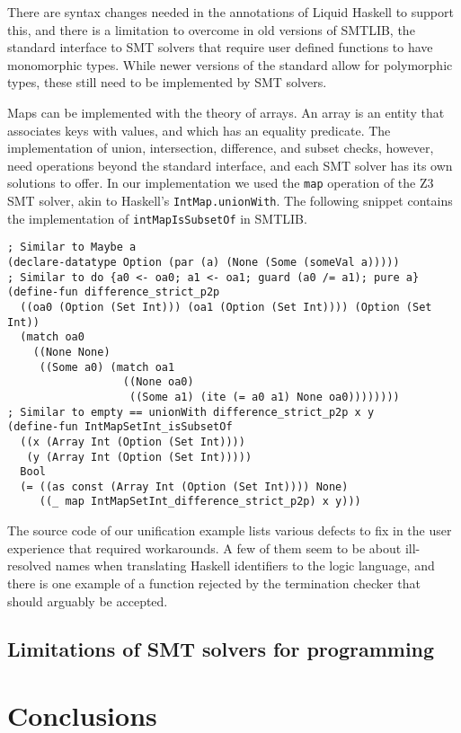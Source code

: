 \documentclass[acmtog, anonymous]{acmart}
\newcommand{\tc}[1]{{\small\texttt{#1}}}
\begin{document}
There are syntax changes needed in the annotations of Liquid Haskell to support
this, and there is a limitation to overcome in old versions of SMTLIB, the standard
interface to SMT solvers \cite{BarFT-RR-25} that require user defined functions to
have monomorphic types. While newer versions of the standard allow for polymorphic
types, these still need to be implemented by SMT solvers.

Maps can be implemented with the theory of arrays. An array is an entity that
associates keys with values, and which has an equality predicate.
The implementation of union, intersection, difference, and subset checks, however,
need operations beyond the standard interface, and each SMT solver has its own
solutions to offer. In our implementation we used the \tc{map} operation of the
Z3 SMT solver, akin to Haskell's \tc{IntMap.unionWith}. The following snippet
contains the implementation of \tc{intMapIsSubsetOf} in SMTLIB.

\begin{verbatim}
; Similar to Maybe a
(declare-datatype Option (par (a) (None (Some (someVal a)))))
; Similar to do {a0 <- oa0; a1 <- oa1; guard (a0 /= a1); pure a}
(define-fun difference_strict_p2p
  ((oa0 (Option (Set Int))) (oa1 (Option (Set Int)))) (Option (Set Int))
  (match oa0
    ((None None)
     ((Some a0) (match oa1
                  ((None oa0)
                   ((Some a1) (ite (= a0 a1) None oa0))))))))
; Similar to empty == unionWith difference_strict_p2p x y
(define-fun IntMapSetInt_isSubsetOf
  ((x (Array Int (Option (Set Int))))
   (y (Array Int (Option (Set Int)))))
  Bool
  (= ((as const (Array Int (Option (Set Int)))) None)
     ((_ map IntMapSetInt_difference_strict_p2p) x y)))
\end{verbatim}

The source code of our unification example lists various defects to fix
in the user experience that required workarounds. A few of them seem to
be about ill-resolved names when translating Haskell identifiers to the
logic language, and there is one example of a function rejected by the
termination checker that should arguably be accepted.


\subsection{Limitations of SMT solvers for programming}
\label{limitations-of-SMT-solvers}



\section{Conclusions}
\label{conclusions}




\end{document}

